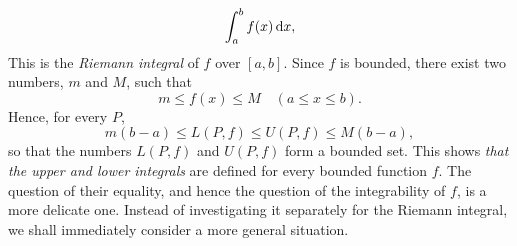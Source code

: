 \begin{mydef}
\begin{equation}
        \int_{a}^{b} f(x) \d x,
    \end{equation}
    This is the \emph{Riemann integral} of $f$ over $[a, b]$. 
    Since $f$ is bounded, there exist two numbers, $m$ and $M$, such that
    \begin{equation*}
        m \leq f(x) \leq M \quad 
        (a \leq x \leq b).
    \end{equation*}
    Hence, for every $P$,
    \begin{equation*}
        m(b - a) \leq L(P,f) \leq U(P,f) \leq M(b - a),
    \end{equation*}
    so that the numbers $L(P,f)$ and $U(P,f)$ form a bounded set. 
    This shows \emph{that the upper and lower integrals} are defined for every bounded function $f$.
    The question of their equality, 
    and hence the question of the integrability of $f$, is a more delicate one. 
    Instead of investigating it separately for the Riemann integral,
    we shall immediately consider a more general situation.
\end{mydef}

